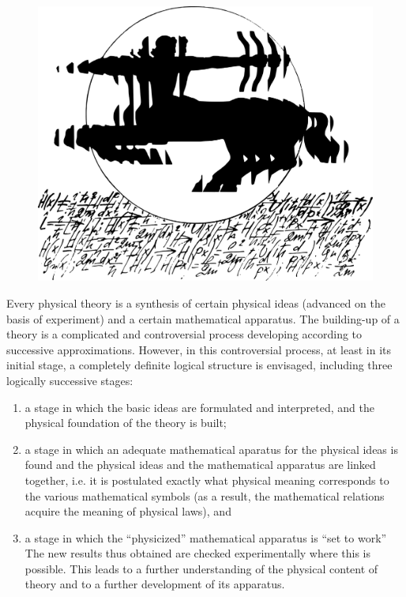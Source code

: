 \documentclass[a4paper,sfsidenotes,colorlinks=true]{tufte-book}
\numberwithin{equation}{section}
\numberwithin{figure}{section}
\begin{document}
\begin{figure}%
\centering
\includegraphics[width=\linewidth]{figures/ch-03.pdf}
\end{figure}
\cleardoublepage

Every physical theory is a synthesis
of certain physical ideas (advanced on the basis of experiment) and a
certain mathematical apparatus. The building-up of a theory is a
complicated and controversial process developing according to
successive approximations. However, in this controversial process,
at least in its initial stage, a completely definite logical structure
is envisaged, including three logically successive stages: 
\begin{enumerate}[leftmargin=1cm, label=(\arabic*)]
\item a stage in which the basic ideas are formulated and interpreted,
  and the physical foundation of the theory is built;
\item a stage in which an adequate mathematical aparatus for the
  physical ideas is found and the physical ideas and the mathematical
  apparatus are linked together, i.e. it is postulated exactly what
  physical meaning corresponds to the various mathematical symbols (as
  a result, the mathematical relations acquire the meaning of physical
  laws), and
\item a stage in which the ``physicized'' mathematical apparatus is
  ``set to work'' The new results thus obtained are checked
  experimentally where this is possible. This leads to a further
  understanding of the physical content of theory and to a further
  development of its apparatus.
\end{enumerate}
\end{document}
